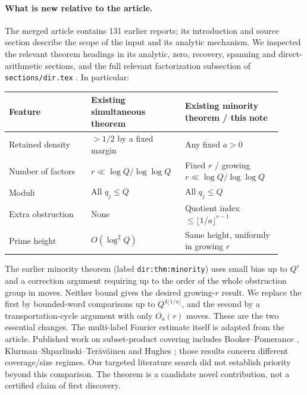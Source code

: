 \documentclass[11pt]{article}
\theoremstyle{remark}\newtheorem{remark}[theorem]{Remark}
\begin{document}
\paragraph{What is new relative to the article.} The merged article \cite{article} contains 131 earlier reports; its introduction and source section describe the scope of the input and its analytic mechanism. We inspected the relevant theorem headings in its analytic, zero, recovery, spanning and direct-arithmetic sections, and the full relevant factorization subsection of \texttt{sections/dir.tex} \cite{dir}. In particular:
\begin{center}
\small
\begin{tabular}{@{}p{0.29\linewidth}p{0.29\linewidth}p{0.33\linewidth}@{}}
\toprule
Feature & Existing simultaneous theorem & Existing minority theorem / this note\\
\midrule
Retained density & $>1/2$ by a fixed margin & Any fixed $a>0$\\
Number of factors & $r\ll\log Q/\log\log Q$ & Fixed $r$ / growing $r\ll\log Q/\log\log Q$\\
Moduli & All $q_j\le Q$ & All $q_j\le Q$\\
Extra obstruction & None & Quotient index $\le\lfloor1/a\rfloor^{r-1}$\\
Prime height & $O(\log^2 Q)$ & Same height, uniformly in growing $r$\\
\bottomrule
\end{tabular}
\end{center}
The earlier minority theorem (label \texttt{dir:thm:minority}) uses small bias up to $Q^r$ and a correction argument requiring up to the order of the whole obstruction group in moves. Neither bound gives the desired growing-$r$ result. We replace the first by bounded-word comparisons up to $Q^{4\lfloor1/a\rfloor}$, and the second by a transportation-cycle argument with only $O_a(r)$ moves. These are the two essential changes. The multi-label Fourier estimate itself is adapted from the article. Published work on subset-product covering includes Booker--Pomerance \cite{bp}, Klurman--Shparlinski--Ter\"av\"ainen \cite{kst} and Hughes \cite{hughes}; those results concern different coverage/size regimes. Our targeted literature search did not establish priority beyond this comparison. The theorem is a candidate novel contribution, not a certified claim of first discovery.
\end{document}
